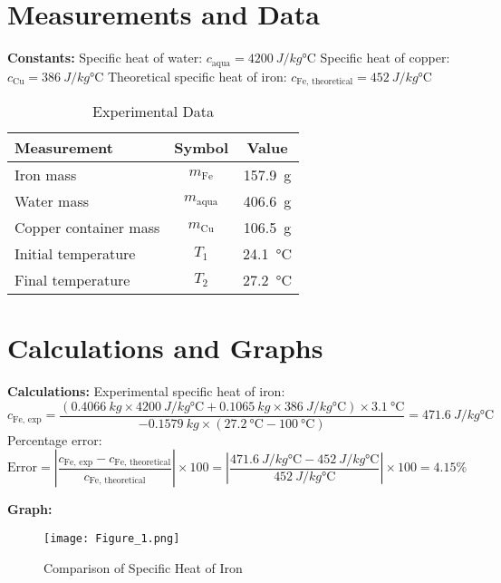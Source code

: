 \documentclass[12pt, a4paper]{article}
\begin{document}
\section{Measurements and Data}
\textbf{Constants:}  
Specific heat of water: $c_{\text{aqua}} = \SI{4200}{J/kg\celsius}$ \quad
Specific heat of copper: $c_{\text{Cu}} = \SI{386}{J/kg\celsius}$ \quad
Theoretical specific heat of iron: $c_{\text{Fe, theoretical}} = \SI{452}{J/kg\celsius}$

\begin{table}[h]
\centering
\begin{tabular}{|l|c|c|}
\hline
\textbf{Measurement} & \textbf{Symbol} & \textbf{Value} \\
\hline
Iron mass & $m_{\text{Fe}}$ & \SI{157.9}{g} \\
Water mass & $m_{\text{aqua}}$ & \SI{406.6}{g} \\
Copper container mass & $m_{\text{Cu}}$ & \SI{106.5}{g} \\
Initial temperature & $T_1$ & \SI{24.1}{\celsius} \\
Final temperature & $T_2$ & \SI{27.2}{\celsius} \\
\hline
\end{tabular}
\caption{Experimental Data}
\label{tab:measurements}
\end{table}

\section{Calculations and Graphs}
\textbf{Calculations:}  
Experimental specific heat of iron:  
  \[
  c_{\text{Fe, exp}} = \frac{(\SI{0.4066}{kg} \times \SI{4200}{J/kg\celsius} + \SI{0.1065}{kg} \times \SI{386}{J/kg\celsius}) \times \SI{3.1}{\celsius}}{-\SI{0.1579}{kg} \times (\SI{27.2}{\celsius} - \SI{100}{\celsius})} = \SI{471.6}{J/kg\celsius}
  \]
Percentage error:  
  \[
  \text{Error} = \left| \frac{c_{\text{Fe, exp}} - c_{\text{Fe, theoretical}}}{c_{\text{Fe, theoretical}}} \right| \times 100 = \left| \frac{\SI{471.6}{J/kg\celsius} - \SI{452}{J/kg\celsius}}{\SI{452}{J/kg\celsius}} \right| \times 100 = 4.15\%
  \]

\textbf{Graph:}  
\begin{figure}[H]
	\centering
	\texttt{[image: Figure\_1.png]}
	\caption{Comparison of Specific Heat of Iron}
	\label{fig:comparison}
\end{figure}
\end{document}
